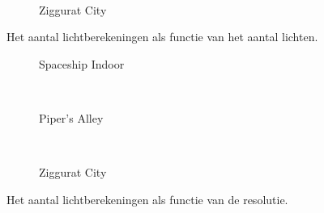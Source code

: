\begin{figure}[t]
\begin{minipage}[t]{0.5\textwidth}
\begin{adjustbox}{minipage=\textwidth, scale=0.55}
\begin{subfigure}[b]{1.6\textwidth}
      \vspace{4pt}
      \label{fig:hs-compare-lights:lc:alley}
    \end{subfigure}
  \end{adjustbox} \\
  \begin{adjustbox}{minipage=\textwidth, scale=0.55}
    \begin{subfigure}[b]{1.6\textwidth}
      \centering
      \def\svgwidth{\textwidth}
      
      \caption{Ziggurat City}
      \label{fig:hs-compare-lights:lc:city}
    \end{subfigure}
  \end{adjustbox}
  \caption{\small Het aantal lichtberekeningen als functie van het aantal lichten.}
  \label{fig:hs-compare-lights:lc}
  \end{minipage}
  \begin{minipage}[t]{0.5\textwidth}
  \begin{adjustbox}{minipage=\textwidth, scale=0.55}
    \begin{subfigure}[b]{1.6\textwidth}
      \centering
      \def\svgwidth{\textwidth}
      
      \caption{Spaceship Indoor}
      \vspace{4pt}
      \label{fig:hs-compare-resolution:lc:indoor}
    \end{subfigure}
  \end{adjustbox} \\
  \begin{adjustbox}{minipage=\textwidth, scale=0.55}
    \begin{subfigure}[b]{1.6\textwidth}
      \centering
      \def\svgwidth{\textwidth}
      
      \caption{Piper's Alley}
      \vspace{4pt}
      \label{fig:hs-compare-resolution:lc:alley}
    \end{subfigure}
  \end{adjustbox} \\
  \begin{adjustbox}{minipage=\textwidth, scale=0.55}
    \begin{subfigure}[b]{1.6\textwidth}
      \centering
      \def\svgwidth{\textwidth}
      
      \caption{Ziggurat City}
      \label{fig:hs-compare-resolution:lc:city}
    \end{subfigure}
  \end{adjustbox}
  \caption{\small Het aantal lichtberekeningen als functie van de resolutie.}
  \label{fig:hs-compare-resolution:lc}
  \end{minipage}
\end{figure}

